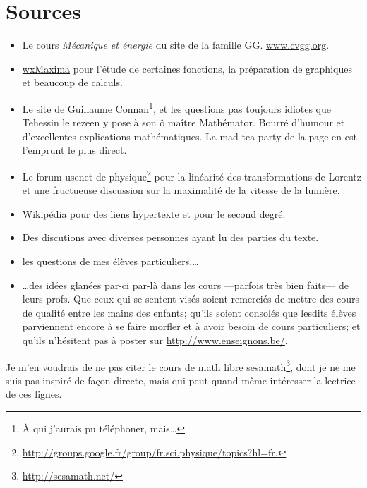 


\section{Sources}

\begin{itemize}
\item Le cours \emph{Mécanique et énergie} du \og site de la famille GG\fg. \href{www.cvgg.org}{www.cvgg.org}.
\item \href{http://maxima.sourceforge.net/}{wxMaxima} pour l'étude de certaines fonctions, la préparation de graphiques et beaucoup de calculs. 
\item \href{http://gconnan.free.fr/}{Le site de Guillaume Connan}\footnote{À qui j'aurais pu téléphoner, mais\ldots}, et les questions pas toujours idiotes que Tehessin le rezeen y pose à son ô maître Mathémator. Bourré d'humour et d'excellentes explications mathématiques. La mad tea party de la page \pageref{PgMadTeaParty} en est l'emprunt le plus direct.
\item Le forum usenet de physique\footnote{\href{http://groups.google.fr/group/fr.sci.physique/topics?hl=fr.}{http://groups.google.fr/group/fr.sci.physique/topics?hl=fr.}} pour la linéarité des transformations de Lorentz et une fructueuse discussion sur la maximalité de la vitesse de la lumière. 
\item Wikipédia pour des liens hypertexte et pour le second degré.
\item Des discutions avec diverses personnes ayant lu des parties du texte.
\item les questions de mes élèves particuliers,\ldots
\item \ldots des idées glanées par-ci par-là dans les cours ---parfois très bien faits--- de leurs profs. Que ceux qui se sentent visés soient remerciés de mettre des cours de qualité entre les mains des enfants; qu'ils soient consolés que lesdits élèves parviennent encore à se faire morfler et à avoir besoin de cours particuliers; et qu'ils n'hésitent pas à poster sur \href{http://www.enseignons.be/}{http://www.enseignons.be/}.
\end{itemize}

Je m'en voudrais de ne pas citer le cours de math libre sesamath\footnote{\href{http://manuel.sesamath.net/}{http://sesamath.net/}}, dont je ne me suis pas inspiré de façon directe, mais qui peut quand même intéresser la lectrice de ces lignes.


